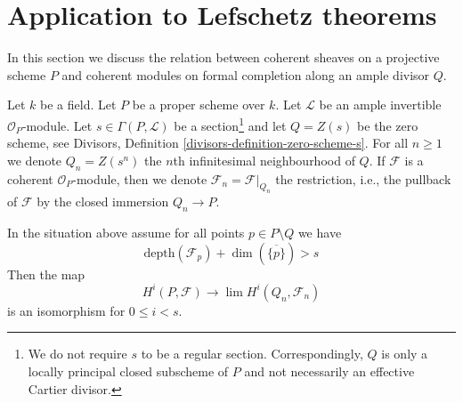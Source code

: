 \section{Application to Lefschetz theorems}
\label{section-lefschetz}

\noindent
In this section we discuss the relation between coherent sheaves on a
projective scheme $P$ and coherent modules on formal completion along
an ample divisor $Q$.

\medskip\noindent
Let $k$ be a field. Let $P$ be a proper scheme over $k$.
Let $\mathcal{L}$ be an ample invertible $\mathcal{O}_P$-module.
Let $s \in \Gamma(P, \mathcal{L})$ be a section\footnote{We do not
require $s$ to be a regular section. Correspondingly, $Q$ is only
a locally principal closed subscheme of $P$ and not necessarily an effective
Cartier divisor.} and let
$Q = Z(s)$ be the zero scheme, see
Divisors, Definition \ref{divisors-definition-zero-scheme-s}.
For all $n \geq 1$ we denote $Q_n = Z(s^n)$
the $n$th infinitesimal neighbourhood of $Q$.
If $\mathcal{F}$ is a coherent $\mathcal{O}_P$-module, then we denote
$\mathcal{F}_n = \mathcal{F}|_{Q_n}$ the restriction, i.e.,
the pullback of $\mathcal{F}$ by the closed immersion
$Q_n \to P$.

\begin{proposition}
\label{proposition-lefschetz}
In the situation above assume for all points $p \in P \setminus Q$ we have
$$
\text{depth}(\mathcal{F}_p) + \dim(\overline{\{p\}}) > s
$$
Then the map
$$
H^i(P, \mathcal{F}) \longrightarrow \lim H^i(Q_n, \mathcal{F}_n)
$$
is an isomorphism for $0 \leq i < s$.
\end{proposition}

